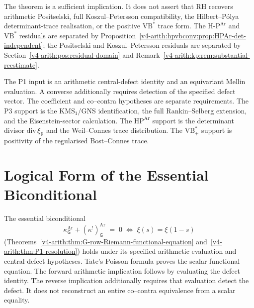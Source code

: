 \begin{remark}
\label{v4-arith:w3-comparison-B:rem:preserved}
The theorem is a sufficient implication.  It does not assert that RH
recovers arithmetic Positselski, full Koszul--Petersson compatibility,
the Hilbert--P\'olya determinant-trace realisation, or the positive
\(\mathrm{VB}^{*}\) trace form.  The
\(\mathrm{H}\text{-}\mathrm{P}^{\mathrm{Ar}}\) and
\(\mathrm{VB}^{*}\) residuals are separated by
Proposition~\ref{v4-arith:hpvbconv:prop:HPAr-det-independent}; the Positselski
and Koszul--Petersson residuals are separated by
Section~\ref{v4-arith:pos:residual-domain} and
Remark~\ref{v4-arith:kp:rem:substantial-reestimate}.
\end{remark}

\begin{remark}
\label{v4-arith:w3-comparison-B:rem:changed}
The P1 input is an arithmetic central-defect identity and an
equivariant Mellin evaluation. A converse additionally requires
detection of the specified defect vector. The coefficient and
co--contra hypotheses are separate requirements.  The P3 support is the
\(\mathrm{KMS}_{1}\)/GNS identification, the full Rankin--Selberg
extension, and the Eisenstein-sector calculation.  The
\(\mathrm{HP}^{\mathrm{Ar}}\) support is the determinant divisor
\(\mathrm{div}\,\xi_{\mathbb R}\) and the Weil--Connes trace
distribution.
The \(\mathrm{VB}^{*}_{+}\) support is positivity of the regularised
Bost--Connes trace.
\end{remark}

\section{Logical Form of the Essential Biconditional}
\label{v4-arith:w3-comparison-B:load-bearing}

The essential biconditional
\begin{equation*}
\kappa^{\mathrm{Ar}}_{\mathsf{G}}+(\kappa^{!})^{\mathrm{Ar}}_{\mathsf{G}}
\;=\;0\;\Longleftrightarrow\;\xi(s)=\xi(1-s)
\end{equation*}
(Theorems~\ref{v4-arith:thm:G-row-Riemann-functional-equation}
and~\ref{v4-arith:thm:P1-resolution}) holds under its specified
arithmetic evaluation and central-defect hypotheses.
Tate's Poisson formula proves the scalar functional equation.
The forward arithmetic implication follows by evaluating the defect
identity. The reverse implication additionally requires that
evaluation detect the defect. It does not reconstruct an entire
co--contra equivalence from a scalar equality.

